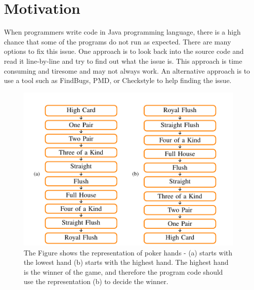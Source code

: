 \section{Motivation} \label{sec:motivation}

When programmers write code in Java programming language, there is a high chance that some of the programs do not run as expected. There are many options to fix this issue. One approach is to look back into the source code and read it line-by-line and try to find out what the issue is. This approach is time consuming and tiresome and may not always work. An alternative approach is to use a tool such as FindBugs, PMD, or Checkstyle to help finding the issue.
\newpage
\begin{figure}[htbp]
\includegraphics[scale=0.4]{motivationImproved.png}
\caption{The Figure shows the representation of poker hands - (a) starts with the lowest hand (b) starts with the highest hand. The highest hand is the winner of the game, and therefore the program code should use the representation (b) to decide the winner.}
\label{fig:pr}
\end{figure}


